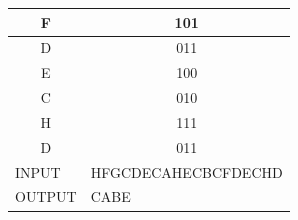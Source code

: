 \documentclass[10pt,journal,compsoc]{IEEEtran}
\begin{document}
{\begin{table}[h]
\begin{tabular}{|c|c|}
		F                            & 101                                      \\ \hline
		D                            & 011                                      \\ \hline
		E                            & 100                                      \\ \hline
		C                            & 010                                      \\ \hline
		H                            & 111                                      \\ \hline
		D                            & 011                                      \\ \hline
		\multicolumn{1}{|l|}{INPUT}  & \multicolumn{1}{l|}{HFGCDECAHECBCFDECHD} \\ \hline
		\multicolumn{1}{|l|}{OUTPUT} & \multicolumn{1}{l|}{CABE}                \\ \hline
	\end{tabular}
\end{table}
}
\end{document}
